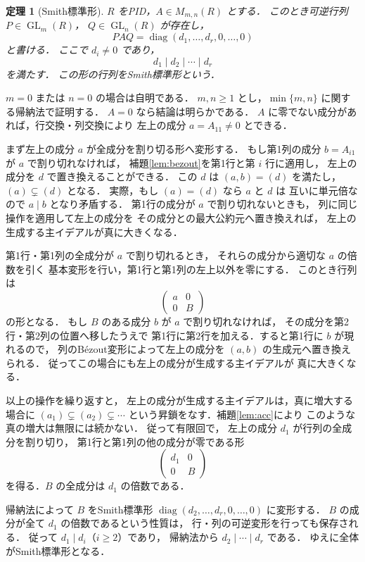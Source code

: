 \documentclass[a5paper,10pt,onecolumn]{jsarticle}
\makeatletter
\theoremstyle{mathnotetheorem}
\newtheorem{theorem}{定理}[section]
\renewcommand{\proofname}{証明}
\renewenvironment{proof}[1][\proofname]{%
  \par\pushQED{\qed}\normalfont\topsep4\p@\@plus2\p@\relax
  \trivlist\item[\hskip\labelsep\bfseries #1]\ignorespaces
}{\popQED\endtrivlist\@endpefalse}
\makeatother
\begin{document}
\begin{theorem}[Smith標準形]\label{thm:smith}
$R$ をPID，$A\in M_{m,n}(R)$ とする．
このとき可逆行列
$P\in\operatorname{GL}_m(R)$，
$Q\in\operatorname{GL}_n(R)$ が存在し，
\[
 PAQ=
 \operatorname{diag}(d_1,\dots,d_r,0,\dots,0)
\]
と書ける．
ここで $d_i\ne0$ であり，
\[
 d_1\mid d_2\mid\cdots\mid d_r
\]
を満たす．
この形の行列をSmith標準形という．
\end{theorem}
\begin{proof}
$m=0$ または $n=0$ の場合は自明である．
$m,n\ge1$ とし，$\min\{m,n\}$ に関する帰納法で証明する．
$A=0$ なら結論は明らかである．
$A$ に零でない成分があれば，行交換・列交換により
左上の成分 $a=A_{11}\ne0$ とできる．

まず左上の成分 $a$ が全成分を割り切る形へ変形する．
もし第1列の成分 $b=A_{i1}$ が $a$ で割り切れなければ，
補題\ref{lem:bezout}を第1行と第 $i$ 行に適用し，
左上の成分を $d$ で置き換えることができる．
この $d$ は $(a,b)=(d)$ を満たし，
$(a)\subsetneq(d)$ となる．
実際，もし $(a)=(d)$ なら $a$ と $d$ は
互いに単元倍なので $a\mid b$ となり矛盾する．
第1行の成分が $a$ で割り切れないときも，
列に同じ操作を適用して左上の成分を
その成分との最大公約元へ置き換えれば，
左上の生成する主イデアルが真に大きくなる．

第1行・第1列の全成分が $a$ で割り切れるとき，
それらの成分から適切な $a$ の倍数を引く
基本変形を行い，第1行と第1列の左上以外を零にする．
このとき行列は
\[
 \begin{pmatrix}a&0\\0&B\end{pmatrix}
\]
の形となる．
もし $B$ のある成分 $b$ が $a$ で割り切れなければ，
その成分を第2行・第2列の位置へ移したうえで
第1行に第2行を加える．すると第1行に $b$ が現れるので，
列のB\'ezout変形によって左上の成分を
$(a,b)$ の生成元へ置き換えられる．
従ってこの場合にも左上の成分が生成する主イデアルが
真に大きくなる．

以上の操作を繰り返すと，
左上の成分が生成する主イデアルは，真に増大する場合に
$(a_1)\subsetneq(a_2)\subsetneq\cdots$
という昇鎖をなす．補題\ref{lem:acc}により
このような真の増大は無限には続かない．
従って有限回で，
左上の成分 $d_1$ が行列の全成分を割り切り，
第1行と第1列の他の成分が零である形
\[
 \begin{pmatrix}d_1&0\\0&B\end{pmatrix}
\]
を得る．$B$ の全成分は $d_1$ の倍数である．

帰納法によって $B$ をSmith標準形
$\operatorname{diag}(d_2,\dots,d_r,0,\dots,0)$ に変形する．
$B$ の成分が全て $d_1$ の倍数であるという性質は，
行・列の可逆変形を行っても保存される．
従って $d_1\mid d_i$（$i\ge2$）であり，
帰納法から $d_2\mid\cdots\mid d_r$ である．
ゆえに全体がSmith標準形となる．
\end{proof}
\end{document}

